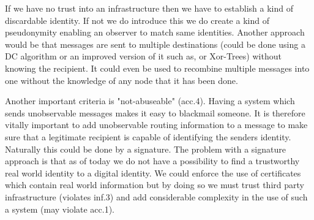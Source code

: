 \documentclass[12pt,journal,compsoc]{IEEEtran}
\begin{document}
\par
If we have no trust into an infrastructure then we have to establish a kind of discardable identity. If not we do introduce this we do create a kind of pseudonymity enabling an observer to match same identities. Another approach would be that messages are sent to multiple destinations (could be done using a DC algorithm\cite{chaum-dc} or an improved version of it such as\cite{golle:eurocrypt2004}, or Xor-Trees\cite{xor-trees}) without knowing the recipient. It could even be used to recombine multiple messages into one without the knowledge of any node that it has been done.
\par
Another important criteria is "not-abuseable" (acc.4). Having a system which sends unobservable messages makes it easy to blackmail someone. It is therefore vitally important to add unobservable routing information to a message to make sure that a legitimate recipient is capable of identifying the senders identity. Naturally this could be done by a signature. The problem with a signature approach is that as of today we do not have a possibility to find a trustworthy real world identity to a digital identity. We could enforce the use of certificates which contain real world information but by doing so we must trust third party infrastructure (violates inf.3) and add considerable complexity in the use of such a system (may violate acc.1).
\end{document}
